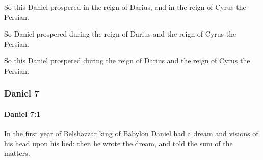 			\begin{versebox}
					\item[BHS] 
					\item[LXX] 
					\item[ASV] So this Daniel prospered in the reign of Darius, and in the reign of Cyrus the Persian.
					\item[NIV] So Daniel prospered during the reign of Darius and the reign of Cyrus the Persian.
					\item[NRSV] So this Daniel prospered during the reign of Darius and the reign of Cyrus the Persian.
			\end{versebox}
	\subsubsection{Daniel 7} %
		\label{DANIEL-7}

		\paragraph{Daniel 7:1} %
			\label{DANIEL-7-1}

			In the first year of Belshazzar king of Babylon Daniel had a dream and visions of his head upon his bed: then he wrote the dream, and told the sum of the matters.

